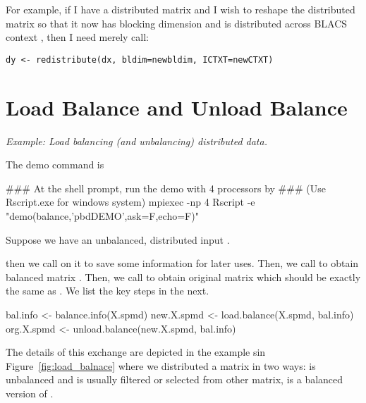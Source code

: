 For example, if I have a distributed matrix  and I wish to reshape the distributed matrix so that it now has blocking dimension  and is distributed across BLACS context , then I need merely call:

\begin{lstlisting}[language=rr]
dy <- redistribute(dx, bldim=newbldim, ICTXT=newCTXT)
\end{lstlisting}



\section[Load Balance and Unload Balance]{Load Balance and Unload Balance}
\label{sec:lb_ub}

\emph{Example:  Load balancing (and unbalancing) distributed data.}

The demo command is
\begin{Command}
### At the shell prompt, run the demo with 4 processors by
### (Use Rscript.exe for windows system)
mpiexec -np 4 Rscript -e "demo(balance,'pbdDEMO',ask=F,echo=F)"
\end{Command}

Suppose we have an unbalanced, distributed input .

then we call  on it to save some information for later uses.
Then, we call  to obtain balanced matrix
.
Then, we call  to obtain original matrix
 which should be exactly the same as .
We list the key steps in the next.
\begin{Code}[title=R Code]
bal.info <- balance.info(X.spmd)
new.X.spmd <- load.balance(X.spmd, bal.info)
org.X.spmd <- unload.balance(new.X.spmd, bal.info)
\end{Code}

The details of this exchange are depicted in the example sin Figure~\ref{fig:load_balnace}
where we distributed a matrix in two ways:
 is unbalanced and is usually filtered or
selected from other matrix,
 is a balanced version of .

